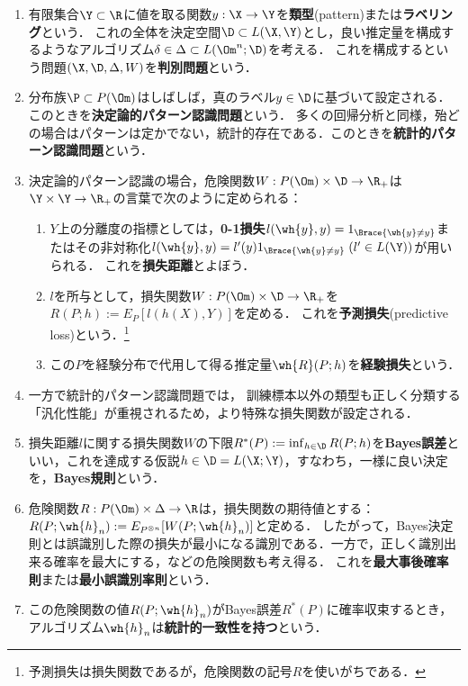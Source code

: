 \documentclass[uplatex,dvipdfmx]{jsreport}
\begin{document}
\begin{problem}\mbox{}
    \begin{enumerate}
        \item 有限集合$\Y\subset\R$に値を取る関数$y:\X\to\Y$を\textbf{類型}(pattern)または\textbf{ラベリング}という．
        これの全体を決定空間$\D\subset L(\X,\Y)$とし，良い推定量を構成するようなアルゴリズム$\delta\in\Delta\subset L(\Om^n;\D)$を考える．
        これを構成するという問題$(\X,\D,\Delta,W)$を\textbf{判別問題}という．
        \item 分布族$\P\subset P(\Om)$はしばしば，真のラベル$y\in\D$に基づいて設定される．
        このときを\textbf{決定論的パターン認識問題}という．
        多くの回帰分析と同様，殆どの場合はパターンは定かでない，統計的存在である．このときを\textbf{統計的パターン認識問題}という．
        \item 
        決定論的パターン認識の場合，危険関数$W:P(\Om)\times\D\to\R_+$は$\Y\times\Y\to\R_+$の言葉で次のように定められる：
        \begin{enumerate}
            \item $Y$上の分離度の指標としては，\textbf{0-1損失}$l(\wh{y},y)=1_{\Brace{\wh{y}\ne y}}$またはその非対称化$l(\wh{y},y)=l'(y)1_{\Brace{\wh{y}\ne y}}\;(l'\in L(\Y))$が用いられる．
            これを\textbf{損失距離}とよぼう．
            \item $l$を所与として，損失関数$W:P(\Om)\times\D\to\R_+$を
            $R(P;h):=E_P[l(h(X),Y)]$を定める．
            これを\textbf{予測損失}(predictive loss)という．\footnote{予測損失は損失関数であるが，危険関数の記号$R$を使いがちである．}
            \item 
            この$P$を経験分布で代用して得る推定量$\wh{R}(P;h)$を\textbf{経験損失}という．
        \end{enumerate}
        \item 一方で統計的パターン認識問題では，
        訓練標本以外の類型も正しく分類する「汎化性能」が重視されるため，より特殊な損失関数が設定される．
        \item 損失距離$l$に関する損失関数$W$の下限$R^*(P):=\inf_{h\in\D}R(P;h)$を\textbf{Bayes誤差}といい，これを達成する仮説$h\in\D=L(\X;\Y)$，すなわち，一様に良い決定を，\textbf{Bayes規則}という．
        \item 危険関数$R:P(\Om)\times\Delta\to\R$は，損失関数の期待値とする：$R(P;\wh{h}_n):=E_{P^{\otimes n}}[W(P;\wh{h}_n)]$と定める．
        したがって，Bayes決定則とは誤識別した際の損失が最小になる識別である．一方で，正しく識別出来る確率を最大にする，などの危険関数も考え得る．
        これを\textbf{最大事後確率則}または\textbf{最小誤識別率則}という．
        \item この危険関数の値$R(P;\wh{h}_n)$がBayes誤差$R^*(P)$に確率収束するとき，アルゴリズム$\wh{h}_n$は\textbf{統計的一致性を持つ}という．
    \end{enumerate}
\end{problem}
\end{document}
